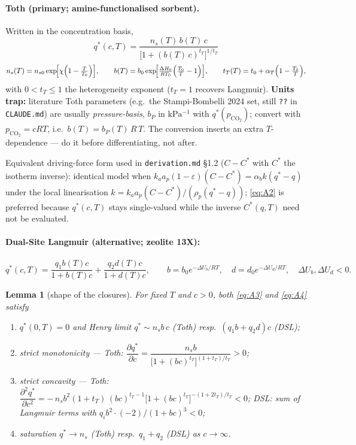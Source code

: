 \documentclass[11pt]{article}
\newtheorem{lemma}{Lemma}
\theoremstyle{remark}
\begin{document}
\paragraph{Toth (primary; amine-functionalised sorbent).} Written in the
concentration basis,
\begin{equation}
\boxed{\;q^*(c,T)=\frac{n_s(T)\,b(T)\,c}{\bigl[1+(b(T)\,c)^{t_T}\bigr]^{1/t_T}}\;}
\tag{A.3}\label{eq:A3}
\end{equation}
\begin{equation*}
n_s(T)=n_{s0}\exp\!\Bigl[\chi\Bigl(1-\tfrac{T}{T_0}\Bigr)\Bigr],\qquad
b(T)=b_0\exp\!\Bigl[\tfrac{\Delta H_0}{R T_0}\Bigl(\tfrac{T_0}{T}-1\Bigr)\Bigr],\qquad
t_T(T)=t_0+\alpha_T\Bigl(1-\tfrac{T_0}{T}\Bigr),
\end{equation*}
with $0<t_T\le 1$ the heterogeneity exponent ($t_T=1$ recovers Langmuir).
\textbf{Units trap:} literature Toth parameters (e.g.\ the Stampi-Bombelli 2024
set, still \texttt{??} in \texttt{CLAUDE.md}) are usually \emph{pressure-basis},
$b_P$ in $\mathrm{kPa^{-1}}$ with $q^*(p_{\mathrm{CO_2}})$; convert with
$p_{\mathrm{CO_2}}=cRT$, i.e.\ $b(T)=b_P(T)\,R\,T$. The conversion inserts an
extra $T$-dependence --- do it before differentiating, not after.

Equivalent driving-force form used in \texttt{derivation.md} \S1.2 ($C-C^*$ with
$C^*$ the isotherm inverse): identical model when
$k_a a_p (1-\varepsilon)(C-C^*) = \alpha_b k (q^*-q)$ under the local
linearisation $k = k_a a_p (C-C^*)/(\rho_p (q^*-q))$; \eqref{eq:A2} is preferred
because $q^*(c,T)$ stays single-valued while the inverse $C^*(q,T)$ need not be
evaluated.

\paragraph{Dual-Site Langmuir (alternative; zeolite 13X):}
\begin{equation}
q^*(c,T)=\frac{q_1 b(T)c}{1+b(T)c}+\frac{q_2 d(T)c}{1+d(T)c},\qquad
b=b_0e^{-\Delta U_b/RT},\quad d=d_0e^{-\Delta U_d/RT},\quad
\Delta U_b,\Delta U_d<0.
\tag{A.4}\label{eq:A4}
\end{equation}

\begin{lemma}[shape of the closures]\label{lem:A1}
For fixed $T$ and $c>0$, both \eqref{eq:A3} and \eqref{eq:A4} satisfy
\begin{enumerate}
\item $q^*(0,T)=0$ and Henry limit $q^*\sim n_s b\,c$ (Toth) resp.\
      $(q_1b+q_2d)c$ (DSL);
\item strict monotonicity --- Toth:
      $\dfrac{\partial q^*}{\partial c}
       = \dfrac{n_s b}{\bigl[1+(bc)^{t_T}\bigr]^{(1+t_T)/t_T}}>0$;
\item strict concavity --- Toth:
      $\dfrac{\partial^2 q^*}{\partial c^2}
       = -\,n_s b^2 (1+t_T)\,(bc)^{t_T-1}
         \bigl[1+(bc)^{t_T}\bigr]^{-(1+2t_T)/t_T}<0$;
      DSL: sum of Langmuir terms with $q_i b^2\cdot(-2)/(1+bc)^3<0$;
\item saturation $q^*\to n_s$ (Toth) resp.\ $q_1+q_2$ (DSL) as $c\to\infty$.
\end{enumerate}
\end{lemma}
\end{document}
